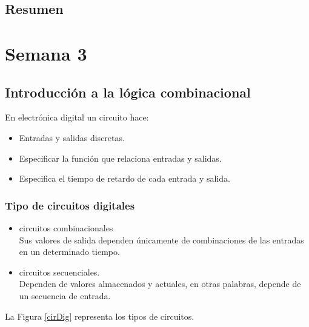 \documentclass[12pt,letterpaper]{book}
\begin{document}
   
   \section{Resumen}

\chapter{Semana 3}

\section{Introducción a la lógica combinacional}

En electrónica digital un circuito hace:
\begin{itemize}
\item Entradas y salidas discretas.
\item Especificar la función que relaciona entradas y salidas.
\item Especifica el tiempo de retardo de cada entrada y salida.
\end{itemize}

\subsection{Tipo de circuitos digitales}

\begin{itemize}
\item circuitos combinacionales\\

Sus valores de salida dependen únicamente de combinaciones de las entradas en un determinado tiempo.

\item circuitos secuenciales.\\

Dependen de valores almacenados y actuales, en otras palabras, depende de un secuencia de entrada.\\

\end{itemize}


La Figura \ref{cirDig} representa los tipos de circuitos.
\end{document}
